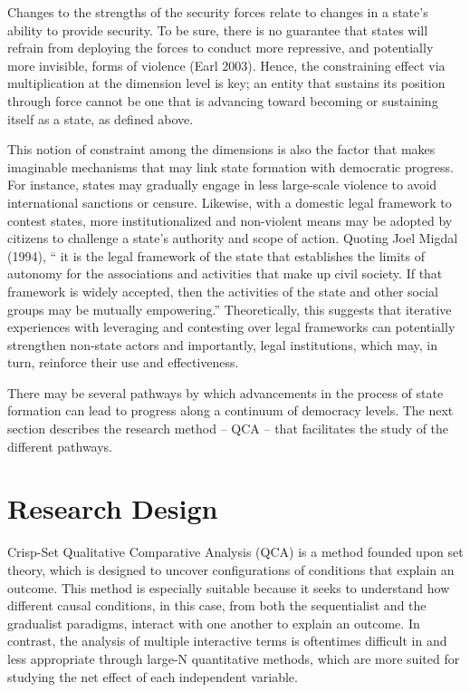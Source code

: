 \documentclass [11pt]{article}
\begin{document}
Changes to the strengths of the security forces relate to changes in a state's ability to provide security. To be sure, there is no guarantee that states will refrain from deploying the forces to conduct more repressive, and potentially more invisible, forms of violence (Earl 2003). Hence, the constraining effect via multiplication at the dimension level is key; an entity that sustains its position through force cannot be one that is advancing toward becoming or sustaining itself as a state, as defined above. 

This notion of constraint among the dimensions is also the factor that makes imaginable mechanisms that may link state formation with democratic progress. For instance, states may gradually engage in less large-scale violence to avoid international sanctions or censure. Likewise, with a domestic legal framework to contest states, more institutionalized and non-violent means may be adopted by citizens to challenge a state's authority and scope of action. Quoting Joel Migdal (1994), `` it is the legal framework of the state that establishes the limits of autonomy for the associations and activities that make up civil society. If that framework is widely accepted, then the activities of the state and other social groups may be mutually empowering.'' Theoretically, this suggests that iterative experiences with leveraging and contesting over legal frameworks can potentially strengthen non-state actors and importantly, legal institutions, which may, in turn, reinforce their use and effectiveness.

There may be several pathways by which advancements in the process of state formation can lead to progress along a continuum of democracy levels. The next section describes the research method -- QCA -- that facilitates the study of the different pathways.

\section*{Research Design}

Crisp-Set Qualitative Comparative Analysis (QCA) is a method founded upon set theory, which is designed to uncover configurations of conditions that explain an outcome. This method is especially suitable because it seeks to understand how different causal conditions, in this case, from both the sequentialist and the gradualist paradigms, interact with one another to explain an outcome. In contrast, the analysis of multiple interactive terms is oftentimes difficult in and less appropriate through large-N quantitative methods, which are more suited for studying the net effect of each independent variable.
\end{document}
